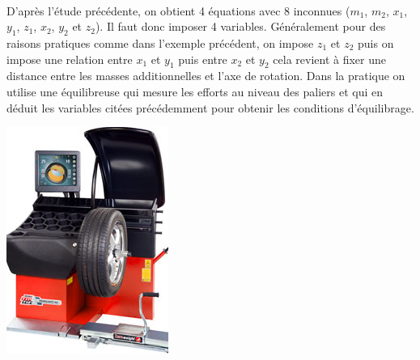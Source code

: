 \documentclass[10pt,fleqn]{article} %
\begin{document}
\begin{prop}~\\

\begin{minipage}[c]{.8\linewidth}
D'après l'étude précédente, on obtient 4 équations avec 8 inconnues ($m_1$, $m_2$, $x_1$, $y_1$, $z_1$, $x_2$, $y_2$ et $z_2$).
Il faut donc imposer 4 variables. Généralement pour des raisons pratiques comme dans l'exemple précédent, on impose $z_1$ et $z_2$ puis on impose une relation entre $x_1$ et $y_1$ puis entre $x_2$ et $y_2$ cela revient à fixer une distance entre les masses additionnelles et l'axe de rotation.
Dans la pratique on utilise une équilibreuse qui mesure les efforts au niveau des paliers et qui en déduit les variables citées précédemment pour obtenir les conditions d'équilibrage.

\end{minipage}\hfill
\begin{minipage}[c]{.15\linewidth}
\begin{center}
\includegraphics[width=.9\linewidth]{images/machine_equilibrage.jpeg}
\end{center}
\end{minipage}
\end{prop}
\end{document}
